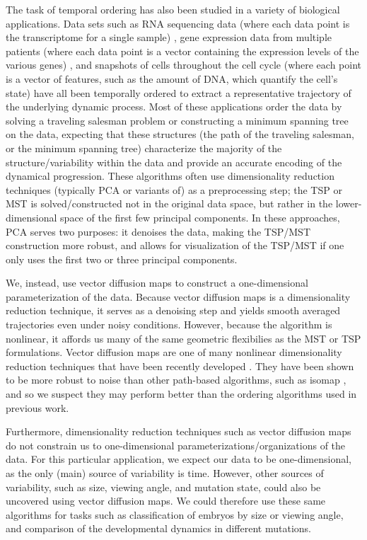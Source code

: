 \documentclass{pnastwo}
\begin{document}
\begin{article}
The task of temporal ordering has also been studied in a variety of biological applications. 
%
Data sets such as  RNA sequencing data (where each data point is the transcriptome for a single sample) \cite{anavy2014blind, trapnell2014dynamics}, gene expression data from multiple patients (where each data point is a vector containing the expression levels of the various genes) \cite{gupta2008extracting, qiu2011discovering}, and snapshots of cells throughout the cell cycle (where each point is a vector of features, such as the amount of DNA, which quantify the cell's state)  \cite{kafri2013dynamics} have all been temporally ordered to extract a representative trajectory of the underlying dynamic process.
%
Most of these applications order the data by solving a traveling salesman problem or constructing a minimum spanning tree on the data,
expecting that these structures (the path of the traveling salesman, or the minimum spanning tree) characterize the majority of the structure/variability within the data and provide an accurate encoding of the dynamical progression.
%
These algorithms often use dimensionality reduction techniques (typically PCA or variants of) as a preprocessing step; the TSP or MST is solved/constructed not in the original data space, but rather in the lower-dimensional space of the first few principal components.
%
In these approaches, PCA serves two purposes: it denoises the data, making the TSP/MST construction more robust, and allows for visualization of the TSP/MST if one only uses the first two or three principal components.

We, instead, use vector diffusion maps to construct a one-dimensional parameterization of the data.
%
Because vector diffusion maps is a dimensionality reduction technique, it serves as a denoising step and yields smooth averaged trajectories even under noisy conditions. 
%
However, because the algorithm is nonlinear, it affords us many of the same geometric flexibilies as the MST or TSP formulations. 
%
Vector diffusion maps are one of many nonlinear dimensionality reduction techniques that have been recently developed \cite{Belkin2003, tenenbaum2000global, Donoho2003, Roweis2000}.
%
They have been shown to be more robust to noise than other path-based algorithms, such as isomap \cite{balasubramanian2002isomap}, and so we suspect they may perform better than the ordering algorithms used in previous work.

Furthermore, dimensionality reduction techniques such as vector diffusion maps do not constrain us to one-dimensional parameterizations/organizations of the data.
%
For this particular application, we expect our data to be one-dimensional, as the only (main) source of variability is time.
%
However, other sources of variability, such as size, viewing angle, and mutation state, could also be uncovered using vector diffusion maps.
%
We could therefore use these same algorithms for tasks such as classification of embryos by size or viewing angle, and comparison of the developmental dynamics in different mutations.


\end{article}
\end{document}
